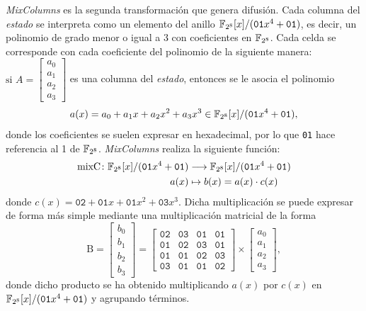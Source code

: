 \textit{MixColumns} es la segunda transformación que genera difusión. Cada columna del \textit{estado} se interpreta como un elemento del anillo $\mathbb{F}_{2^8} [x]/(\texttt{01}x^4+\texttt{01})$, es decir, un polinomio de grado menor o igual a 3 con coeficientes en $\mathbb{F}_{2^8}$. Cada celda se corresponde con cada coeficiente del polinomio de la siguiente manera:
\(
\text{si }A = \begin{bmatrix}a_0\\a_1\\a_2\\a_3\end{bmatrix}
\)
es una columna del \textit{estado}, entonces se le asocia el polinomio $$a(x)= a_0 + a_1x + a_2x^2 + a_3x^3\in \mathbb{F}_{2^8}[x]/(\texttt{01}x^4+\texttt{01}),$$ donde los coeficientes se suelen expresar en hexadecimal, por lo que \texttt{01} hace referencia al 1 de $\mathbb{F}_{2^8}$. \textit{MixColumns} realiza la siguiente función:
\begin{align*}
     \text{mixC}\colon \mathbb{F}_{2^8}[x]/(\texttt{01}x^4+\texttt{01}) &\longrightarrow \mathbb{F}_{2^8}[x]/(\texttt{01}x^4+\texttt{01})\\
     a(x) &\mapsto b(x) = a(x) \cdot c(x)
\end{align*}
donde $c(x) = \texttt{02} + \texttt{01}x +\texttt{01}x^2 +\texttt{03}x^3$. Dicha multiplicación se puede expresar de forma más simple mediante una multiplicación matricial de la forma 
\[
\text{B}  =
    \begin{bmatrix} 
    b_0 \\ b_1 \\ b_2 \\ b_3
    \end{bmatrix} 
= 
    \begin{bmatrix} 
        \texttt{02} & \texttt{03} & \texttt{01} & \texttt{01}\\
        \texttt{01} & \texttt{02} & \texttt{03} & \texttt{01}\\
        \texttt{01} & \texttt{01} & \texttt{02} & \texttt{03}\\
        \texttt{03} & \texttt{01} & \texttt{01} & \texttt{02}
    \end{bmatrix} 
\times 
    \begin{bmatrix} 
    a_0 \\ a_1 \\ a_2 \\ a_3
    \end{bmatrix}
,
\]
donde dicho producto se ha obtenido multiplicando $a(x)$ por $c(x)$ en $\mathbb{F}_{2^8}[x]/(\texttt{01}x^4+\texttt{01})$ y agrupando términos.\bigskip

